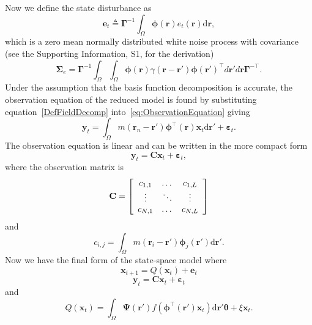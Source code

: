 \documentclass[10pt]{article}
\begin{document}
Now we define the state disturbance as
\begin{equation}\label{eq:Wt} 
	\mathbf{e}_t \triangleq \boldsymbol{\Gamma}^{-1}\int_\Omega {\boldsymbol{\phi} ( \mathbf{r} )e_t( \mathbf{r} )\textrm{d}\mathbf{r}},
\end{equation}
which is a zero mean normally distributed white noise process with covariance (see the Supporting Information, S1, for the derivation)
\begin{equation}
	\boldsymbol\Sigma_e =\mathbf{\Gamma}^{-1}\int_{\Omega}\int_{\Omega}\boldsymbol{\phi}\left(\mathbf r\right) \gamma\left(\mathbf r- \mathbf r' \right)\boldsymbol{\phi}\left(\mathbf r'\right)^{\top}d\mathbf r' d\mathbf r\mathbf{\Gamma}^{- \top}. 
\end{equation}
Under the assumption that the basis function decomposition is accurate, the observation equation of the reduced model is found by substituting equation~\ref{DefFieldDecomp} into~\ref{eq:ObservationEquation} giving
\begin{equation}\label{eq:ReducedObservationEquation}
	\mathbf{y}_t = \int_{\Omega}{m\left(\mathbf{r}_n-\mathbf{r}'\right)\boldsymbol{\phi}^{\top}\left(\mathbf{r}\right) \mathbf{x}_t\textrm{d}\mathbf{r}'} + \boldsymbol{\varepsilon}_t. 
\end{equation}
The observation equation is linear and can be written in the more compact form
\begin{equation}\label{ObservationEquation} 
	\mathbf{y}_t = \mathbf{C}\mathbf{x}_t + \boldsymbol{\varepsilon}_t,
\end{equation}
where the observation matrix is 
\begin{equation}
	\mathbf{C} = \left[
	\begin{array}{{ccc}} 
		c_{1,1} & \dots & c_{1,L} \\
		\vdots & \ddots & \vdots \\
		c_{N,1} & \dots & c_{N,L} 
	\end{array}
	\right] 
\end{equation}
and 
\begin{equation}
	c_{i,j} = \int_{\Omega}m(\mathbf{r}_i - \mathbf{r}')\boldsymbol{\phi}_j(\mathbf{r}')\textrm{d}\mathbf{r}'. 
\end{equation}
Now we have the final form of the state-space model where
\begin{equation}\label{eq:finalformstatespacemodel}
	\mathbf{x}_{t+1} = Q(\mathbf{x}_t) +\mathbf{e}_t
\end{equation}
\begin{equation} 
	\mathbf{y}_t = \mathbf{C}\mathbf{x}_t + \boldsymbol{\varepsilon}_t
\end{equation}
and 
\begin{equation}\label{eq:QmatrixForSigmapoints}
	Q(\mathbf{x}_t) = \int_\Omega \boldsymbol{\Psi}(\mathbf{r}') f(\boldsymbol{\phi}^{\top}(\mathbf{r}')\mathbf{x}_t) \textrm{d}\mathbf{r}' \boldsymbol{\theta} + \xi\mathbf{x}_t.
\end{equation}
\end{document}

